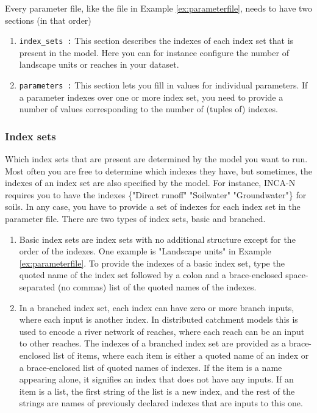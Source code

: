 \documentclass[11pt]{article}
\theoremstyle{definition}
\begin{document}
Every parameter file, like the file in Example \ref{ex:parameterfile}, needs to have two sections (in that order)
\begin{enumerate}[i]
\item {\tt index\_sets :} This section describes the indexes of each index set that is present in the model. Here you can for instance configure the number of landscape units or reaches in your dataset.
\item {\tt parameters :} This section lets you fill in values for individual parameters. If a parameter indexes over one or more index set, you need to provide a number of values corresponding to the number of (tuples of) indexes.
\end{enumerate}

\subsubsection{Index sets}
Which index sets that are present are determined by the model you want to run. Most often you are free to determine which indexes  they have, but sometimes, the indexes of an index set are also specified by the model. For instance, INCA-N requires you to have the indexes \{"Direct runoff" "Soilwater" "Groundwater"\} for soils. In any case, you have to provide a set of indexes for each index set in the parameter file. There are two types of index sets, basic and branched.
\begin{enumerate}[i]
\item Basic index sets are index sets with no additional structure except for the order of the indexes. One example is "Landscape units" in Example \ref{ex:parameterfile}. To provide the indexes of a basic index set, type the quoted name of the index set followed by a colon and a brace-enclosed space-separated (no commas) list of the quoted names of the indexes.
\item In a branched index set, each index can have zero or more branch inputs, where each input is another index. In distributed catchment models this is used to encode a river network of reaches, where each reach can be an input to other reaches. The indexes of a branched index set are provided as a brace-enclosed list of items, where each item is either a quoted name of an index or a brace-enclosed list of quoted names of indexes. If the item is a name appearing alone, it signifies an index that does not have any inputs. If an item is a list, the first string of the list is a new index, and the rest of the strings are names of previously declared indexes that are inputs to this one.
\end{enumerate}
\end{document}
